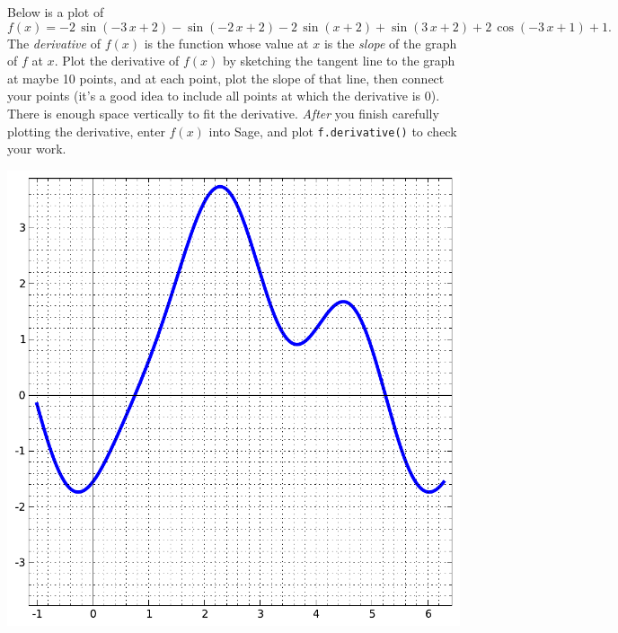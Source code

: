 Below is a plot of $$f(x)=-2 \, \sin\left(-3 \, x + 2\right) - \sin\left(-2 \, x + 2\right) - 2 \, \sin\left(x + 2\right) + \sin\left(3 \, x + 2\right) + 2 \, \cos\left(-3 \, x + 1\right) + 1.$$  The {\em \color{red}derivative} of $f(x)$ is the function whose value at $x$ is the {\em slope} of the graph of $f$ at $x$.  Plot the derivative of $f(x)$ by sketching the tangent line to the graph at maybe 10 points, and at each point, plot the slope of that line, then connect your points (it's a good idea to include all points at which the derivative is 0).  There is enough space vertically to fit the derivative.  {\em After} you finish carefully plotting the derivative, enter $f(x)$ into Sage, and plot {\color{blue}\verb|f.derivative()|} to check your work.
\begin{center}\includegraphics{functions/13.pdf}\end{center}\newpage

